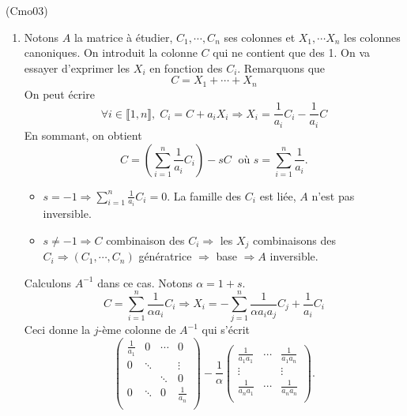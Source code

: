 \begin{tiny} (Cmo03) \end{tiny}
\begin{enumerate}
 \item Notons $A$ la matrice à étudier, $C_1, \cdots, C_n$ ses colonnes et $X_1, \cdots X_n$ les colonnes canoniques. On introduit la colonne $C$ qui ne contient que des 1. On va essayer d'exprimer les $X_i$ en fonction des $C_i$. Remarquons que 
\[
 C = X_1 + \cdots + X_n
\]
On peut écrire
\begin{displaymath}
 \forall i \in \llbracket 1,n \rrbracket,\;
C_i = C + a_i X_i \Rightarrow 
X_i = \frac{1}{a_i}C_i - \frac{1}{a_i}C
\end{displaymath}
En sommant, on obtient
\begin{displaymath}
 C = \left( \sum_{i=1}^n\frac{1}{a_i}C_i\right)  - sC\;
\text{ où }
s = \sum_{i=1}^n\frac{1}{a_i}.
\end{displaymath}
\begin{itemize}
 \item $s=-1 \Rightarrow \sum_{i=1}^n\frac{1}{a_i}C_i = 0$. La famille des $C_i$ est liée, $A$ n'est pas inversible.
 \item $s\neq -1 \Rightarrow C$ combinaison des $C_i \Rightarrow$ les $X_j$ combinaisons des $C_i \Rightarrow (C_1,\cdots,C_n)$ génératrice $\Rightarrow$ base $ \Rightarrow A$ inversible.
\end{itemize}\medskip
Calculons $A^{-1}$ dans ce cas. Notons $\alpha = 1+s$.
\begin{displaymath}
 C = \sum_{i=1}^n\frac{1}{\alpha a_i}C_i 
 \Rightarrow 
 X_i = - \sum_{j=1}^n\frac{1}{\alpha a_i a_j}C_j + \frac{1}{a_i}C_i
\end{displaymath}
Ceci donne la $j$-ème colonne de $A^{-1}$ qui s'écrit
\begin{displaymath}
\begin{pmatrix}
 \frac{1}{a_1} & 0      & \cdots & 0 \\
 0             & \ddots &        & \vdots  \\ 
               &        & \ddots &  0 \\
 0             & \ddots &    0   & \frac{1}{a_n}  \\
\end{pmatrix}
 - \frac{1}{\alpha}
 \begin{pmatrix}
  \frac{1}{a_1 a_1} & \cdots & \frac{1}{a_1 a_n} \\
  \vdots            &        & \vdots            \\
  \frac{1}{a_n a_1} & \cdots &  \frac{1}{a_n a_n}  \\
 \end{pmatrix}.
\end{displaymath}


\end{enumerate}
